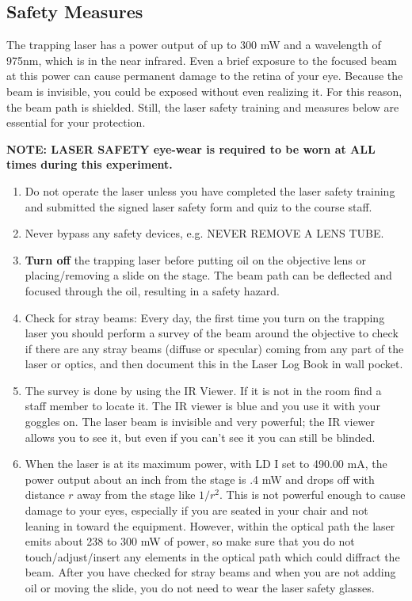 \documentclass{../lab}
\begin{document}
\subsection{Safety Measures}

The trapping laser has a power output of up to 300 mW and a wavelength of 975nm, which is in the near infrared. Even a brief exposure to the focused beam at this power can cause permanent damage to the retina of your eye. Because the beam is invisible, you could be exposed without even realizing it. For this reason, the beam path is shielded. Still, the laser safety training and measures below are essential for your protection.

\textbf{NOTE: LASER  SAFETY eye-wear is required to be worn at ALL times during this experiment.}

\begin{enumerate}
    \item Do not operate the laser unless you have completed the laser safety training and submitted the signed laser safety form and quiz to the course staff.

    \item Never bypass any safety devices, e.g. NEVER REMOVE A LENS TUBE.

    \item \textbf{Turn off} the trapping laser before putting oil on the objective lens or placing/removing a slide on the stage. The beam path can be deflected and focused through the oil, resulting in a safety hazard.

    \item Check for stray beams: Every day, the first time you turn on the trapping laser you should perform a survey of the beam around the objective to check if there are any stray beams (diffuse or specular) coming from any part of the laser or optics, and then document this in the Laser Log Book in wall pocket.

    \item The survey is done by using the IR Viewer. If it is not in the room find a staff member to locate it. The IR viewer is blue and you use it with your goggles on. The laser beam is invisible and very powerful; the IR viewer allows you to see it, but even if you can't see it you can still be blinded.

    \item When the laser is at its maximum power, with LD I set to 490.00 mA, the power output about an inch from the stage is .4 mW and drops off with distance $r$ away from the stage like $1/r^2$. This is not powerful enough to cause damage to your eyes, especially if you are seated in your chair and not leaning in toward the equipment. However, within the optical path the laser emits about 238 to 300 mW of power, so make sure that you do not touch/adjust/insert any elements in the optical path which could diffract the beam. After you have checked for stray beams and when you are not adding oil or moving the slide, you do not need to wear the laser safety glasses.

\end{enumerate}
\end{document}
